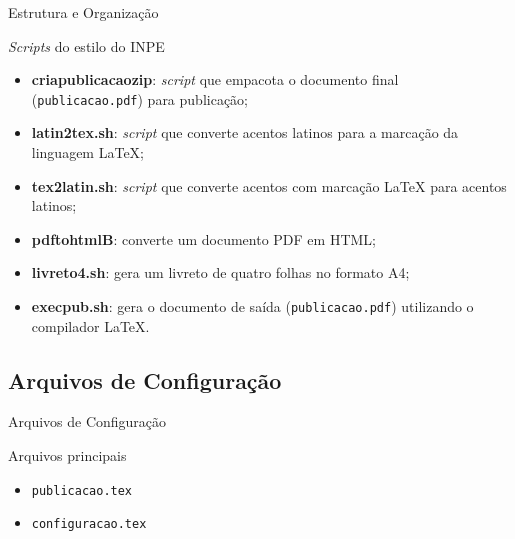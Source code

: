 \documentclass[10pt]{beamer}
\begin{document}
\begin{frame}{Estrutura e Organização}
    \begin{block}{\textit{Scripts} do estilo do INPE}
        \begin{itemize}[label=\textbullet]
            \pause
            \item \textbf{criapublicacaozip}: \textit{script} que empacota o documento final ({\tt publicacao.pdf}) para publicação;
            \pause
            \item \textbf{latin2tex.sh}: \textit{script} que converte acentos latinos para a marcação da linguagem \LaTeX{};
            \pause
            \item \textbf{tex2latin.sh}: \textit{script} que converte acentos com marcação \LaTeX{} para acentos latinos;
            \pause
            \item \textbf{pdftohtmlB}: converte um documento PDF em HTML;
            \pause
            \item \textbf{livreto4.sh}: gera um livreto de quatro folhas no formato A4;
            \pause
            \item \textbf{execpub.sh}: gera o documento de saída ({\tt publicacao.pdf}) utilizando o compilador \LaTeX{}. 
        \end{itemize}       
    \end{block}
\end{frame}

\subsection{Arquivos de Configuração}

\begin{frame}{Arquivos de Configuração}
    \begin{block}{Arquivos principais}
        \begin{itemize}[label=\textbullet]
            \item {\tt publicacao.tex}
            \item {\tt configuracao.tex}
        \end{itemize}
    \end{block}
\end{frame}

\end{document}
